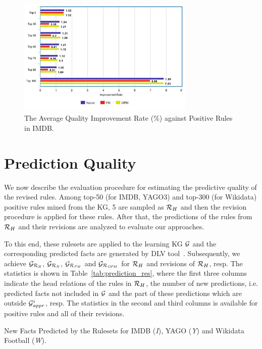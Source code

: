 \begin{figure}[ht]
\centering
\includegraphics[width=0.75\textwidth]{figures/table_1_5_imdb.jpeg}
\caption{The Average Quality Improvement Rate (\%) against Positive Rules in IMDB.}
\label{fig_1_5_imdb}
\end{figure}

\section{Prediction Quality}

We now describe the evaluation procedure for estimating the predictive quality of the revised rules. Among top-50 (for IMDB, YAGO3) and top-300 (for Wikidata) positive rules mined from the KG, 5 are sampled as $\mathcal{R}_H$ and then the revision procedure is applied for these rules. After that, the predictions of the rules from $\mathcal{R}_H$ and their revisions are analyzed to evaluate our approaches.

To this end, these rulesets are applied to the learning KG $\mathcal{G}$ and the corresponding predicted facts are generated by DLV tool~\cite{dlv}. Subsequently, we achieve $\mathcal{G}_{\mathcal{R}_{\mathit{H}}}$, $\mathcal{G}_{\mathcal{R}_{\mathit{N}}}$, $\mathcal{G}_{\mathcal{R}_{\mathit{PM}}}$ and $\mathcal{G}_{\mathcal{R}_{\mathit{OPM}}}$ for $\mathcal{R}_H$ and revisions of $\mathcal{R}_H$, resp. The statistics is shown in Table~\ref{tab:prediction_res}, where the first three columns indicate the head relations of the rules in $\mathcal{R}_H$, the number of new predictions, i.e. predicted facts not included in $\mathcal{G}$ and the part of these predictions which are outside $\mathcal{G}^i_{\mathit{appr}}$, resp. The statistics in the second and third columns is available for positive rules and all of their revisions.

\begin{table}[ht]
\centering

\smallskip
\caption{New Facts Predicted by the Rulesets for IMDB (\textit{I}), YAGO (\textit{Y}) and Wikidata Football (\textit{W}).}
\label{tab:prediction_res}
\end{table}

